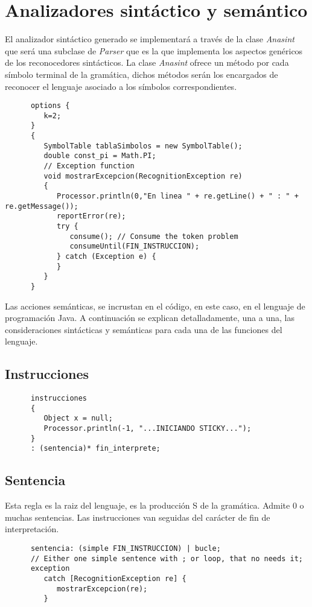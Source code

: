 \chapter{Analizadores sintáctico y semántico}
El analizador sintáctico generado se implementará a través de la clase \textit{Anasint} que será una subclase de \textit{Parser}
que es la que implementa los aspectos genéricos de los reconocedores sintácticos. La clase \textit{Anasint} ofrece un método por cada
símbolo terminal de la gramática, dichos métodos serán los encargados de reconocer el lenguaje asociado a los símbolos correspondientes.\\

   \begin{lstlisting}
      options {
         k=2; 
      }      
      {
         SymbolTable tablaSimbolos = new SymbolTable();
         double const_pi = Math.PI;
         // Exception function
         void mostrarExcepcion(RecognitionException re)
         {
            Processor.println(0,"En linea " + re.getLine() + " : " + re.getMessage());
            reportError(re);
            try {
               consume(); // Consume the token problem
               consumeUntil(FIN_INSTRUCCION);
            } catch (Exception e) {
            }
         }
      }
    \end{lstlisting}
   Las acciones semánticas, se incrustan en el código, en este caso, en el lenguaje de programación Java. A continuación se explican
   detalladamente, una a una, las consideraciones sintácticas y semánticas para cada una de las funciones del lenguaje.


   \section{Instrucciones}
   \begin{lstlisting}
      instrucciones 
      {
         Object x = null;
         Processor.println(-1, "...INICIANDO STICKY...");   
      }
      : (sentencia)* fin_interprete;
   \end{lstlisting}

   \section{Sentencia}
   Esta regla es la raiz del lenguaje, es la producción S de la gramática. Admite 0 o muchas sentencias. Las instrucciones van seguidas
   del carácter de fin de interpretación.
   \begin{lstlisting}
      sentencia: (simple FIN_INSTRUCCION) | bucle; 
      // Either one simple sentence with ; or loop, that no needs it;
      exception
         catch [RecognitionException re] {
            mostrarExcepcion(re);
         }
   \end{lstlisting}

